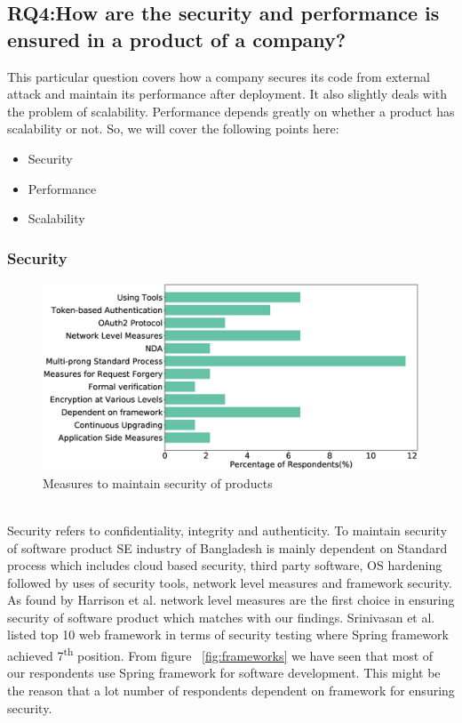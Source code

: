 \subsection{RQ4:How are the security and performance is ensured in
a product of a company?}
\label{RQ4}
This particular question covers how a company secures its code from external attack and maintain its performance after deployment. It also slightly deals with the problem of scalability. Performance depends greatly on whether a product has scalability or not. So, we will cover the following points here:
\begin{itemize}
    \item Security
    \item Performance
    \item Scalability
\end{itemize}
\subsubsection{Security}
\label{Security}
\begin{figure}[htbp]
\includegraphics[scale=0.28]{Figures/Security.eps} 
\caption{Measures to maintain security of products}
\label{fig:Measures to ensure security}
\end{figure}
\hfill\\
Security refers to confidentiality, integrity and authenticity. To maintain security of software product SE industry of Bangladesh is mainly dependent on Standard process which includes cloud based security, third party software, OS hardening followed by uses of security tools, network level measures and framework security. As found by Harrison et al.\citep{Harrison2010} network level measures are the first choice in ensuring security of software product which matches with our findings. Srinivasan et al.\citep{Srinivasan2017} listed top 10 web framework in terms of security testing where Spring framework achieved 7\textsuperscript{th} position. From figure ~\ref{fig:frameworks} we have seen that most of our respondents use Spring framework for software development. This might be the reason that a lot number of respondents dependent on framework for ensuring security.
